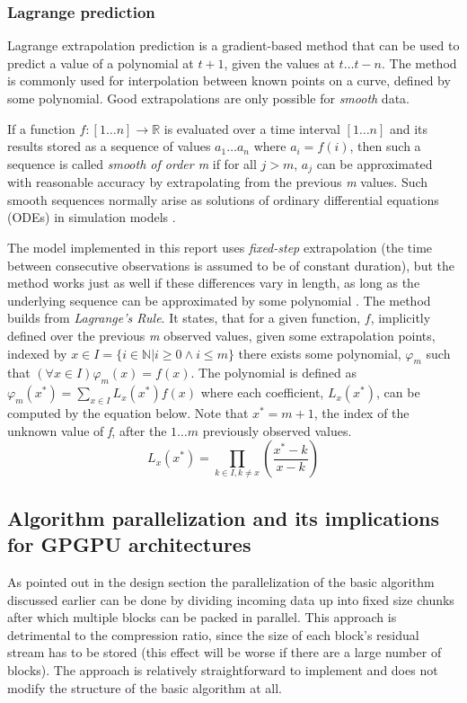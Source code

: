  \subsubsection{Lagrange prediction}
  Lagrange extrapolation prediction is a gradient-based method that can be used to predict a value of a polynomial at $t+1$, given the values at $t\dots t-n$.
  The method is commonly used for interpolation between known points on a curve, defined by some polynomial. Good extrapolations are only possible for 
  \textit{smooth} data.
  
  If a function $f:[1\dots n] \rightarrow \mathbb{R}$ is evaluated over a time interval $[1\dots n]$ and its results stored as a sequence of values 
  $a_{1}\dots a_{n}$ where $a_{i} = f(i)$, then such a sequence is called \textit{smooth of order m} if for all $j>m$, $a_{j}$ can be approximated with reasonable
  accuracy by extrapolating from the previous \textit{m} values. Such smooth sequences normally arise as solutions of ordinary differential equations (ODEs) in
  simulation models \cite{engelson2000lossless}.
  
  The model implemented in this report uses \emph{fixed-step} extrapolation (the time between consecutive observations is assumed to be of constant duration), but
  the method works just as well if these differences vary in length, as long as the underlying sequence can be approximated by some polynomial \cite{engelson2000lossless}. 
  The method builds from \textit{Lagrange's Rule}. It states, that for a given function, $f$, implicitly defined over the previous \textit{m} 
  observed values, given some extrapolation points, indexed by $x\in I = \{i\in\mathbb{N}|i\geq 0\wedge i\leq m\}$ there exists some polynomial, $\varphi_{m}$ such that 
  $(\forall x\in I) \varphi_{m}(x)=f(x)$. The polynomial is defined as $\varphi_{m}(x^{*})=\sum_{x\in I}L_{x}(x^{*})f(x)$ where each coefficient, $L_{x}(x^{*})$, 
  can be computed by the equation below. Note that $x^{*} = m + 1$, the index of the unknown value of \textit{f}, after the $1\dots m$ previously observed values.
  \begin{equation}
   L_{x}(x^{*}) = \prod_{k\in{I},k\neq x}\left(\frac{x^{*}-k}{x-k}\right)
  \end{equation}

 \subsection{Algorithm parallelization and its implications for GPGPU architectures}
  As pointed out in the design section the parallelization of the basic algorithm discussed earlier can be done by dividing incoming data up into fixed size chunks after which 
  multiple blocks can be packed in parallel. This approach is detrimental to the compression ratio, since the size of each block's residual stream has to be stored 
  (this effect will be worse if there are a large number of blocks). The approach is relatively straightforward to implement and does not modify the structure 
  of the basic algorithm at all.
  

